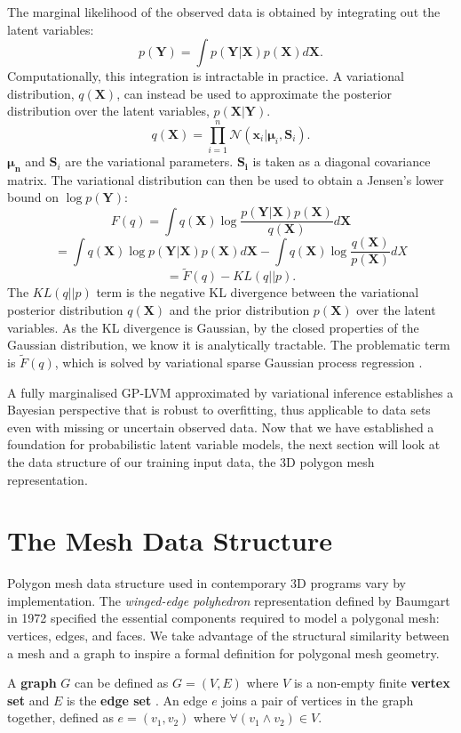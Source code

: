 \documentclass[ %
author={Dillon Keith Diep},
supervisor={Dr. Carl Henrik Ek},
degree={MEng},
title={ART-CG Hair:},
subtitle={Assisted Real-time Content Generation of Stylised Virtual Hair},
type={Research},
year={2017} ]{dissertation}
\begin{document}
	The marginal likelihood of the observed data is obtained by integrating out the latent variables:
	$$p(\bm{Y})=\int p(\bm{Y|X})p(\bm{X})d\bm{X}.$$
	Computationally, this integration is intractable in practice. A variational distribution, $q(\bm{X})$, can instead be used to approximate the posterior distribution over the latent variables, $p(\bm{X|Y})$.
	$$q(\bm{X})=\prod^n_{i=1}\mathcal{N}(\bm{x}_i|\bm{\mu}_i,\bm{S}_i).$$
	$\bm{\mu_n}$ and $\bm{S}_i$ are the variational parameters. $\bm{S_i}$ is taken as a diagonal covariance matrix. 
	The variational distribution can then be used to obtain a Jensen's lower bound on $\log p(\bm{Y})$:
	$$F(q)=\int q(\bm{X})\log \frac{ p(\bm{Y|X})p(\bm{X}) }{ q(\bm{X}) } d\bm{X}$$
	$$=\int q(\bm{X})\log p(\bm{Y|X})p(\bm{X})d\bm{X} - \int q(\bm{X})\log\frac{q(\bm{X})}{p(\bm{X})}dX$$
	$$=\tilde{F}(q)-KL(q||p).$$
	The $KL(q||p)$ term is the negative KL divergence between the variational posterior distribution $q(\bm{X})$ and the prior distribution $p(\bm{X})$ over the latent variables. As the KL divergence is Gaussian, by the closed properties of the Gaussian distribution, we know it is analytically tractable. The problematic term is $\tilde{F}(q)$, which is solved by variational sparse Gaussian process regression \cite{bgplvm}.
	
	A fully marginalised GP-LVM approximated by variational inference establishes a Bayesian perspective that is robust to overfitting, thus applicable to data sets even with missing or uncertain observed data. Now that we have established a foundation for probabilistic latent variable models, the next section will look at the data structure of our training input data, the 3D polygon mesh representation.
	
	\section{The Mesh Data Structure}
	Polygon mesh data structure used in contemporary 3D programs vary by implementation. The \textit{winged-edge polyhedron} representation defined by Baumgart in 1972 \cite{wingededge} specified the essential components required to model a polygonal mesh: vertices, edges, and faces. We take advantage of the structural similarity between a mesh and a graph to inspire a formal definition for polygonal mesh geometry.
	
	A \textbf{graph} $G$ can be defined as $G=(V,E)$ where $V$ is a non-empty finite \textbf{vertex set} and $E$ is the \textbf{edge set} \cite[p.8]{graphtheory}. An edge $e$ joins a pair of vertices in the graph together, defined as $e=(v_1, v_2)$ where $\forall(v_1 \land v_2)\in V$.
	
\end{document}
